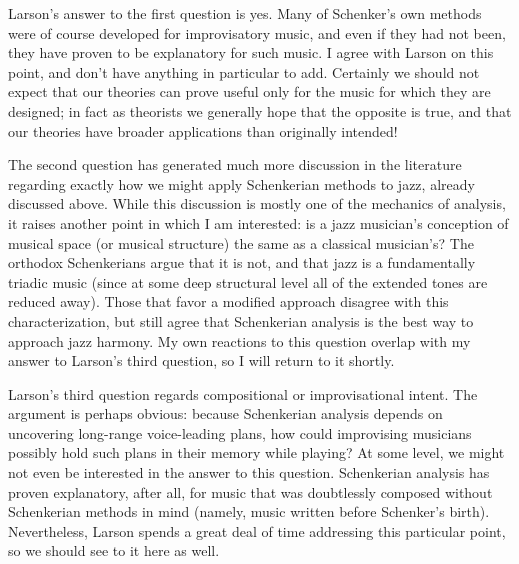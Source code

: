Larson’s answer to the first question is yes. Many of Schenker’s own methods
were of course developed for improvisatory music, and even if they had not
been, they have proven to be explanatory for such music. I agree
with Larson on this point, and don’t have anything in particular to add.
Certainly we should not expect that our theories can prove useful only for the
music for which they are designed; in fact as theorists we generally hope that
the opposite is true, and that our theories have broader applications than
originally intended!

The second question has generated much more discussion in the literature
regarding exactly how we might apply Schenkerian methods to jazz, already
discussed above. While this discussion is mostly one of the mechanics of
analysis, it raises another point in which I am interested: is a jazz
musician’s conception of musical space (or musical structure) the same as a
classical musician’s? The orthodox Schenkerians argue that it is not, and that
jazz is a fundamentally triadic music (since at some deep structural level all
of the extended tones are reduced away). Those that favor a modified approach
disagree with this characterization, but still agree that Schenkerian analysis
is the best way to approach jazz harmony. My own reactions to this question
overlap with my answer to Larson’s third question, so I will return to it
shortly.

Larson’s third question regards compositional or improvisational intent. The
argument is perhaps obvious: because Schenkerian analysis depends on
uncovering long-range voice-leading plans, how could improvising musicians
possibly hold such plans in their memory while playing? At some level, we
might not even be interested in the answer to this question. Schenkerian
analysis has proven explanatory, after all, for music that was doubtlessly
composed without Schenkerian methods in mind (namely, music written before
Schenker’s birth). Nevertheless, Larson spends a great deal of time addressing
this particular point, so we should see to it here as well.


